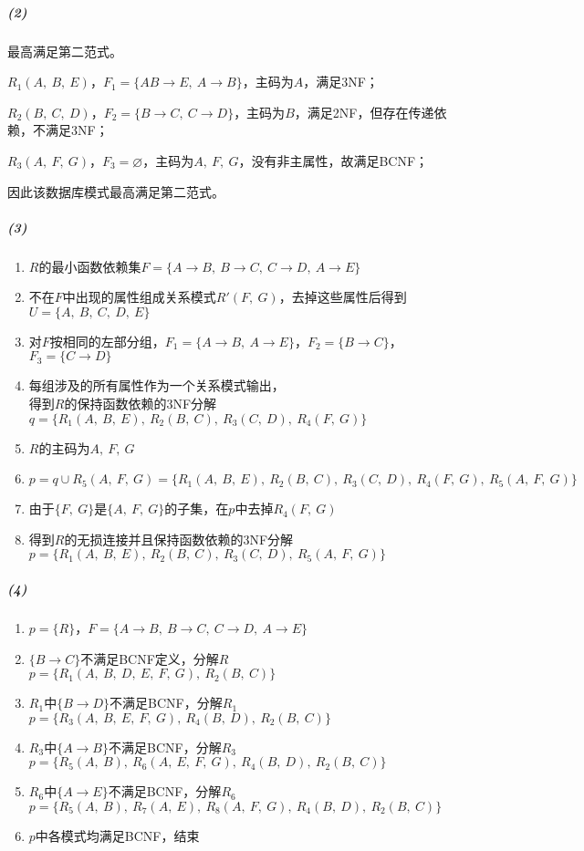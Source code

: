 \documentclass{article}
\begin{document}
\subparagraph{(2)}
最高满足第二范式。\par
$R_1(A,\ B,\ E)$，$F_1 = \{AB \rightarrow E,\ A \rightarrow B\}$，主码为$A$，满足3NF；\par
$R_2(B,\ C,\ D)$，$F_2 = \{B \rightarrow C,\ C \rightarrow D\}$，主码为$B$，满足2NF，但存在传递依赖，不满足3NF；\par
$R_3(A,\ F,\ G)$，$F_3 = \varnothing$，主码为$A,\ F,\  G$，没有非主属性，故满足BCNF；\par
因此该数据库模式最高满足第二范式。

\subparagraph{(3)}
\begin{enumerate}[label = \emph{\alph*}.]
    \item $R$的最小函数依赖集$F = \{A \rightarrow B,\ B \rightarrow C,\ C \rightarrow D,\ A \rightarrow E\}$
    \item 不在$F$中出现的属性组成关系模式$R'(F,\ G)$，去掉这些属性后得到$U = \{A,\ B,\ C,\ D,\ E\}$
    \item 对$F$按相同的左部分组，$F_1 = \{A \rightarrow B,\ A \rightarrow E\}$，$F_2 = \{B \rightarrow C\}$，$F_3 = \{C \rightarrow D\}$
    \item 每组涉及的所有属性作为一个关系模式输出，\\ 得到$R$的保持函数依赖的3NF分解$q = \{R_1(A,\ B,\ E),\ R_2(B,\ C),\ R_3(C,\ D),\ R_4(F,\ G)\}$
    \item $R$的主码为$A,\ F,\  G$
    \item $p = q \cup R_5(A,\ F,\ G) = \{R_1(A,\ B,\ E),\ R_2(B,\ C),\ R_3(C,\ D),\ R_4(F,\ G),\ R_5(A,\ F,\ G)\}$
    \item 由于$\{F,\ G\}$是$\{A,\ F,\ G\}$的子集，在$p$中去掉$R_4(F,\ G)$
    \item 得到$R$的无损连接并且保持函数依赖的3NF分解 \\ $p = \{R_1(A,\ B,\ E),\ R_2(B,\ C),\ R_3(C,\ D),\ R_5(A,\ F,\ G)\}$
\end{enumerate}

\subparagraph{(4)}
\begin{enumerate}[label = \emph{\alph*}.]
    \item $p = \{R\}$，$F = \{A \rightarrow B,\ B \rightarrow C,\ C \rightarrow D,\ A \rightarrow E\}$
    \item $\{B \rightarrow C\}$不满足BCNF定义，分解$R$ \\ $p = \{R_1(A,\ B,\ D,\ E,\ F,\ G),\ R_2(B,\ C)\}$
    \item $R_1$中$\{B \rightarrow D\}$不满足BCNF，分解$R_1$ \\ $p = \{R_3(A,\ B,\ E,\ F,\ G),\ R_4(B,\ D),\ R_2(B,\ C)\}$
    \item $R_3$中$\{A \rightarrow B\}$不满足BCNF，分解$R_3$ \\ $p = \{R_5(A,\ B),\ R_6(A,\ E,\ F,\ G),\ R_4(B,\ D),\ R_2(B,\ C)\}$
    \item $R_6$中$\{A \rightarrow E\}$不满足BCNF，分解$R_6$ \\ $p = \{R_5(A,\ B),\ R_7(A,\ E),\ R_8(A,\ F,\ G),\ R_4(B,\ D),\ R_2(B,\ C)\}$
    \item $p$中各模式均满足BCNF，结束
\end{enumerate}
\end{document}
